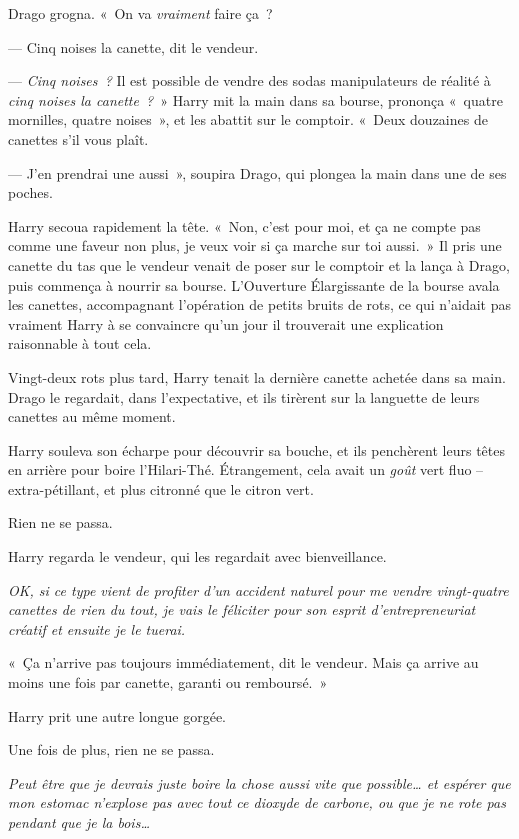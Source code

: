 Drago grogna.  «~On va \emph{vraiment} faire ça~?

--- Cinq noises la canette, dit le vendeur.

--- \emph{Cinq noises~?} Il est possible de vendre des sodas manipulateurs de réalité à \emph{cinq noises la canette~?}~»
Harry mit la main dans sa bourse, prononça «~quatre mornilles, quatre noises~», et les abattit sur le comptoir.
«~Deux douzaines de canettes s'il vous plaît.

--- J'en prendrai une aussi~», soupira Drago, qui plongea la main dans une de ses poches.

Harry secoua rapidement la tête.
«~Non, c'est pour moi, et ça ne compte pas comme une faveur non plus, je veux voir si ça marche sur toi aussi.~»
Il pris une canette du tas que le vendeur venait de poser sur le comptoir et la lança à Drago, puis commença à nourrir sa bourse.
L'Ouverture Élargissante de la bourse avala les canettes, accompagnant l'opération de petits bruits de rots, ce qui n'aidait pas vraiment Harry à se convaincre qu'un jour il trouverait une explication raisonnable à tout cela.

Vingt-deux rots plus tard, Harry tenait la dernière canette achetée dans sa main.
Drago le regardait, dans l'expectative, et ils tirèrent sur la languette de leurs canettes au même moment.

Harry souleva son écharpe pour découvrir sa bouche, et ils penchèrent leurs têtes en arrière pour boire l'Hilari-Thé.
Étrangement, cela avait un \emph{goût} vert fluo -- extra-pétillant, et plus citronné que le citron vert.

Rien ne se passa.

Harry regarda le vendeur, qui les regardait avec bienveillance.

\emph{OK, si ce type vient de profiter d'un accident naturel pour me vendre vingt-quatre canettes de rien du tout, je vais le féliciter pour son esprit d'entrepreneuriat créatif et ensuite je le tuerai.}

«~Ça n'arrive pas toujours immédiatement, dit le vendeur. Mais ça arrive au moins une fois par canette, garanti ou remboursé.~»

Harry prit une autre longue gorgée.

Une fois de plus, rien ne se passa.

\emph{Peut être que je devrais juste boire la chose aussi vite que possible… et espérer que mon estomac n'explose pas avec tout ce dioxyde de carbone, ou que je ne rote pas pendant que je la bois…}


